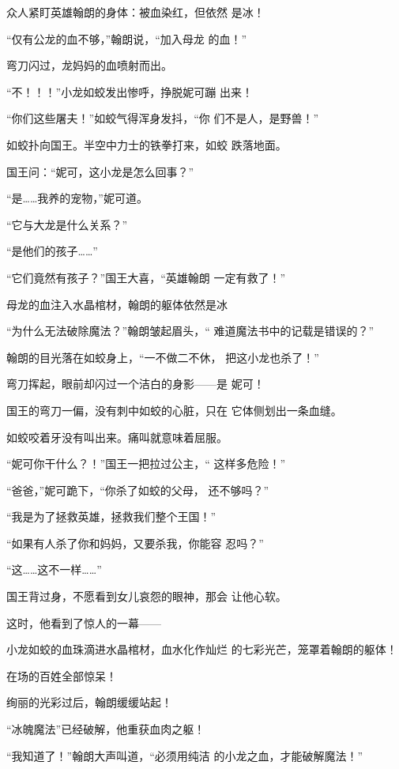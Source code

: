 \documentclass{article}
\begin{document}
众人紧盯英雄翰朗的身体：被血染红，但依然
是冰！ 

“仅有公龙的血不够，”翰朗说，“加入母龙
的血！” 


弯刀闪过，龙妈妈的血喷射而出。 

\newpage

“不！！！”小龙如蛟发出惨呼，挣脱妮可蹦
出来！ 

“你们这些屠夫！”如蛟气得浑身发抖，“你
们不是人，是野兽！” 

如蛟扑向国王。半空中力士的铁拳打来，如蛟
跌落地面。 


国王问：“妮可，这小龙是怎么回事？” 


“是……我养的宠物，”妮可道。 


“它与大龙是什么关系？” 


“是他们的孩子……” 

“它们竟然有孩子？”国王大喜，“英雄翰朗
一定有救了！” 

母龙的血注入水晶棺材，翰朗的躯体依然是冰
\newpage


“为什么无法破除魔法？”翰朗皱起眉头，“
难道魔法书中的记载是错误的？” 

翰朗的目光落在如蛟身上，“一不做二不休，
把这小龙也杀了！” 

弯刀挥起，眼前却闪过一个洁白的身影——是
妮可！ 

国王的弯刀一偏，没有刺中如蛟的心脏，只在
它体侧划出一条血缝。 

如蛟咬着牙没有叫出来。痛叫就意味着屈服。

“妮可你干什么？！”国王一把拉过公主，“
这样多危险！” 

“爸爸，”妮可跪下，“你杀了如蛟的父母，
还不够吗？” 

\newpage

“我是为了拯救英雄，拯救我们整个王国！”

“如果有人杀了你和妈妈，又要杀我，你能容
忍吗？” 


“这……这不一样……” 

国王背过身，不愿看到女儿哀怨的眼神，那会
让他心软。 


这时，他看到了惊人的一幕—— 

小龙如蛟的血珠滴进水晶棺材，血水化作灿烂
的七彩光芒，笼罩着翰朗的躯体！ 


在场的百姓全部惊呆！ 


绚丽的光彩过后，翰朗缓缓站起！ 


“冰魄魔法”已经破解，他重获血肉之躯！ 

\newpage

“我知道了！”翰朗大声叫道，“必须用纯洁
的小龙之血，才能破解魔法！” 
\end{document}
